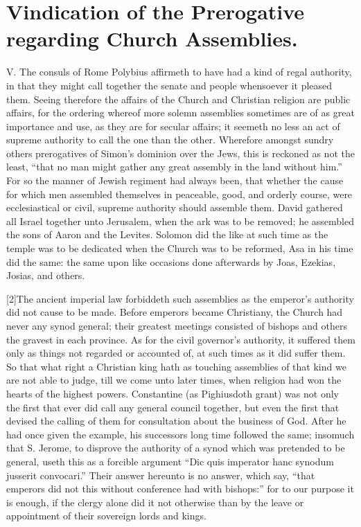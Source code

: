 

\section*{Vindication of the Prerogative regarding Church Assemblies.}

V. The consuls of Rome Polybius affirmeth to have had a kind of regal authority, in that they might call together the senate and people whensoever it pleased them. Seeing therefore the affairs of the Church and Christian religion are public affairs, for the ordering whereof more solemn assemblies sometimes are of as great importance and use, as they are for secular affairs; it seemeth no less an act of supreme authority to call the one than the other. Wherefore amongst sundry others prerogatives of Simon’s dominion over the Jews, this is reckoned as not the least, “that no man might gather any great assembly in the land without him.” For so the manner of Jewish regiment had always been, that whether the cause for which men assembled themselves in peaceable, good, and orderly course, were ecclesiastical or civil, supreme authority should assemble them. David gathered all Israel together unto Jerusalem, when the ark was to be removed; he assembled the sons of Aaron and the Levites. Solomon did the like at such time as the temple was to be dedicated when the Church was to be reformed, Asa in his time did the same: the same upon like occasions done afterwards by Joas, Ezekias, Josias, and others.

[2]The ancient imperial law forbiddeth such assemblies  as the emperor’s authority did not cause to be made. Before emperors became Christiany, the Church had never any synod general; their greatest meetings consisted of bishops and others the gravest in each province. As for the civil governor’s authority, it suffered them only as things not regarded or accounted of, at such times as it did suffer them. So that what right a Christian king hath as touching assemblies of that kind we are not able to judge, till we come unto later times, when religion had won the hearts of the highest powers. Constantine (as Pighiusdoth grant) was not only the first that ever did call any general council together, but even the first that devised the calling of them for consultation about the business of God. After he had once given the example, his successors long time followed the same; insomuch that S. Jerome, to disprove the authority of a synod which was pretended to be general, useth this as a forcible argument “Dic quis imperator hanc synodum jusserit convocari.” Their answer hereunto is no answer, which say, “that emperors did not this without conference had with  bishops:” for to our purpose it is enough, if the clergy alone did it not otherwise than by the leave or appointment of their sovereign lords and kings.

